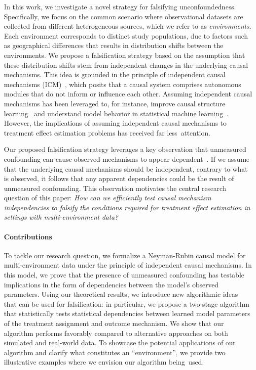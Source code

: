 \documentclass{article}
\begin{document}
In this work, we investigate a novel strategy for falsifying unconfoundedness. Specifically, we focus on the common scenario where observational datasets are collected from different heterogeneous sources, which we refer to as \textit{environments}. Each environment corresponds to distinct study populations, due to factors such as geographical differences that results in distribution shifts between the environments. We propose a falsification strategy based on the assumption that these distribution shifts stem from independent changes in the underlying causal mechanisms. This idea is grounded in the principle of independent causal mechanisms (ICM)~\citep{janzing2012information, peters2017elements}, which posits that a causal system comprises autonomous modules that do not inform or influence each other. Assuming independent causal mechanisms has been leveraged to, for instance, improve causal structure learning~\citep{huang2020causal, guo2024causal} and understand model behavior in statistical machine learning~\citep{scholkopf2012anticausal}. However, the implications of assuming independent causal mechanisms to treatment effect estimation problems has received far less~attention. 

Our proposed falsification strategy leverages a key observation that unmeasured confounding can cause observed mechanisms to appear dependent~\citep{janzing2018detecting,karlsson2023detecting,mameche2024identifying,reddy2024detectingmeasuringconfoundingusing}. If we assume that the underlying causal mechanisms should be independent, contrary to what is observed, it follows that any apparent dependencies could be the result of unmeasured confounding. This observation motivates the central research question of this paper: \textit{How can we efficiently test causal mechanism independencies to falsify the conditions required for treatment effect estimation in settings with multi-environment data?} 

\paragraph{Contributions} To tackle our research question,  we formalize a Neyman-Rubin causal model for multi-environment data under the principle of independent causal mechanisms. In this model, we prove that the presence of unmeasured confounding has testable implications in the form of dependencies between the model's observed parameters.  Using our theoretical results, we introduce new algorithmic ideas that can be used for falsification: in particular, we propose a two-stage algorithm that statistically tests statistical dependencies between learned model parameters of the treatment assignment and outcome mechanism. We show that our algorithm performs favorably compared to alternative approaches on both simulated and real-world data. To showcase the potential applications of our algorithm and clarify what constitutes an ``environment'', we provide two illustrative examples where we envision our algorithm being~used.
\end{document}
